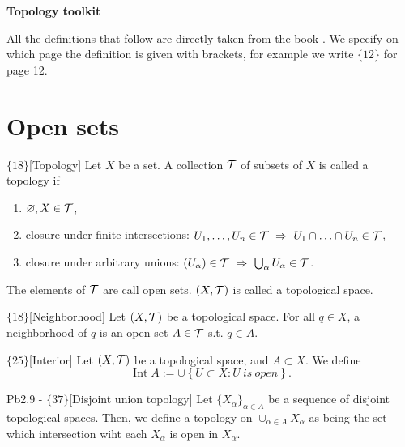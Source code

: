 \documentclass{article}
\begin{document}
\begin{center}
    \textbf{Topology toolkit}
\end{center}

All the definitions that follow are directly taken from the book \cite{lee2000manifolds}. We specify on which page the definition is given with brackets, for example we write $\{12\}$ for page 12.

\section{Open sets}

\begin{flexidefinition}{$\{18\}$}[Topology]
    Let $X$ be a set. A collection $\mathcal{T}$ of subsets of $X$ is called a topology if
    \begin{enumerate}[label = (\alph*)]
        \item $\varnothing, X \in \mathcal{T}$,
        \item closure under finite intersections: $U_1, \ldots, U_n \in \mathcal{T} \ \Rightarrow \ U_1 \cap \ldots \cap U_n \in \mathcal{T}$,
        \item closure under arbitrary unions: $(U_\alpha) \in \mathcal{T} \ \Rightarrow \ \bigcup_{\alpha} U_\alpha \in \mathcal{T}$.
    \end{enumerate}
    The elements of $\mathcal{T}$ are call open sets. $(X, \mathcal{T})$ is called a topological space.
\end{flexidefinition}

\begin{flexidefinition}{$\{18\}$}[Neighborhood]
    Let $(X,\mathcal{T})$ be a topological space. For all $q \in X$, a neighborhood of $q$ is an open set $A \in \mathcal{T}$ s.t. $q \in A$.
\end{flexidefinition}

\begin{flexidefinition}{$\{25\}$}[Interior]
    Let $(X,\mathcal{T})$ be a topological space, and $A \subset X$. We define
    \begin{equation}
        \operatorname{Int} A := \cup \left\{ U \subset X : U \ is \ open \right\}.
    \end{equation}
\end{flexidefinition}

\begin{flexilemma}{Pb2.9 - $\{37\}$}[Disjoint union topology]
    Let $\{X_\alpha\}_{\alpha \in A}$ be a sequence of disjoint topological spaces. Then, we define a topology on $\cup_{\alpha \in A} X_\alpha$ as being the set which intersection wiht each $X_\alpha$ is open in $X_\alpha$.
\end{flexilemma}
\end{document}
